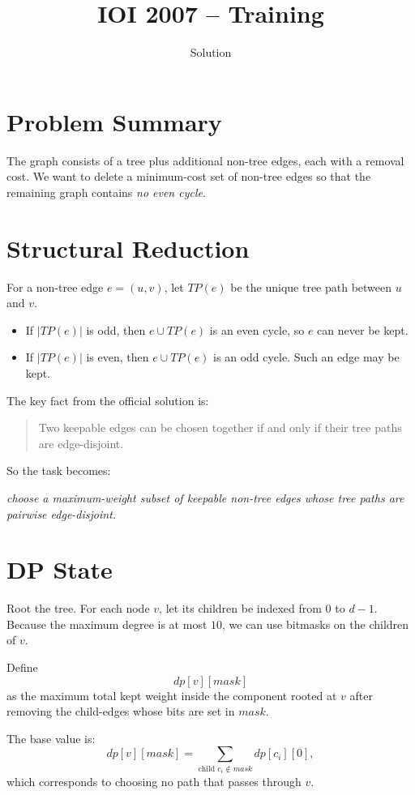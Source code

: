 \documentclass[11pt,a4paper]{article}
\title{IOI 2007 -- Training}
\author{Solution}
\date{}
\begin{document}
\maketitle

\section{Problem Summary}
The graph consists of a tree plus additional non-tree edges, each with a removal cost.
We want to delete a minimum-cost set of non-tree edges so that the remaining graph
contains \emph{no even cycle}.

\section{Structural Reduction}
For a non-tree edge $e=(u,v)$, let $TP(e)$ be the unique tree path between $u$ and $v$.

\begin{itemize}
  \item If $|TP(e)|$ is odd, then $e \cup TP(e)$ is an even cycle, so $e$ can never be kept.
  \item If $|TP(e)|$ is even, then $e \cup TP(e)$ is an odd cycle. Such an edge may be kept.
\end{itemize}

The key fact from the official solution is:
\begin{quote}
Two keepable edges can be chosen together if and only if their tree paths are edge-disjoint.
\end{quote}

So the task becomes:
\begin{center}
\emph{choose a maximum-weight subset of keepable non-tree edges whose tree paths are pairwise edge-disjoint.}
\end{center}

\section{DP State}
Root the tree.
For each node $v$, let its children be indexed from $0$ to $d-1$.
Because the maximum degree is at most $10$, we can use bitmasks on the children of $v$.

Define
\[
dp[v][mask]
\]
as the maximum total kept weight inside the component rooted at $v$ after removing the
child-edges whose bits are set in $mask$.

The base value is:
\[
dp[v][mask] = \sum_{\text{child } c_i \notin mask} dp[c_i][0],
\]
which corresponds to choosing no path that passes through $v$.
\end{document}
